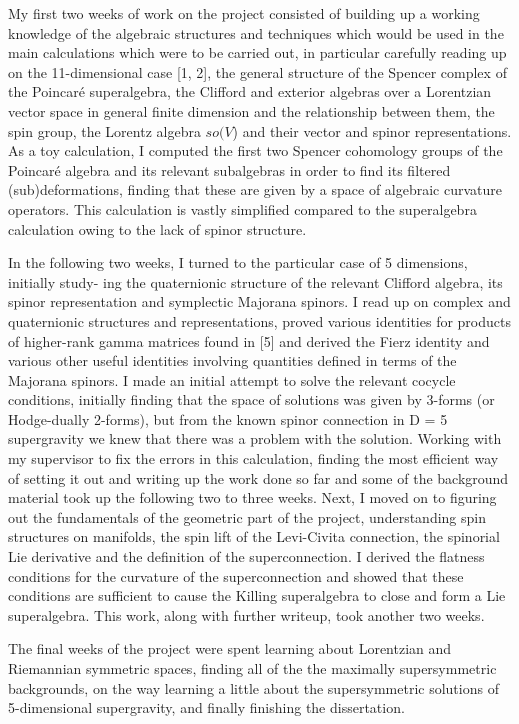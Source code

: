 \documentclass[12pt,a4paper]{report}
\begin{document}
My first two weeks of work on the project consisted of building up a
working knowledge of the algebraic structures and techniques which
would be used in the main calculations which were to be carried out,
in particular carefully reading up on the 11-dimensional case [1, 2],
the general structure of the Spencer complex of the Poincar\'e
superalgebra, the Clifford and exterior algebras over a Lorentzian
vector space in general finite dimension and the relationship between
them, the spin group, the Lorentz algebra $so(V$) and their vector and
spinor representations. As a toy calculation, I computed the first two
Spencer cohomology groups of the Poincar\'e algebra and its relevant
subalgebras in order to find its filtered (sub)deformations, finding
that these are given by a space of algebraic curvature operators. This
calculation is vastly simplified compared to the superalgebra
calculation owing to the lack of spinor structure.

In the following two weeks, I turned to the particular case of 5
dimensions, initially study- ing the quaternionic structure of the
relevant Clifford algebra, its spinor representation and symplectic
Majorana spinors. I read up on complex and quaternionic structures and
representations, proved various identities for products of higher-rank
gamma matrices found in [5] and derived the Fierz identity and various
other useful identities involving quantities defined in terms of the
Majorana spinors. I made an initial attempt to solve the relevant
cocycle conditions, initially finding that the space of solutions was
given by 3-forms (or Hodge-dually 2-forms), but from the known spinor
connection in D = 5 supergravity we knew that there was a problem with
the solution. Working with my supervisor to fix the errors in this
calculation, finding the most efficient way of setting it out and
writing up the work done so far and some of the background material
took up the following two to three weeks.  Next, I moved on to
figuring out the fundamentals of the geometric part of the project,
understanding spin structures on manifolds, the spin lift of the
Levi-Civita connection, the spinorial Lie derivative and the
definition of the superconnection. I derived the flatness conditions
for the curvature of the superconnection and showed that these
conditions are sufficient to cause the Killing superalgebra to close
and form a Lie superalgebra. This work, along with further writeup,
took another two weeks.

The final weeks of the project were spent learning about Lorentzian
and Riemannian symmetric spaces, finding all of the the maximally
supersymmetric backgrounds, on the way learning a little about the
supersymmetric solutions of 5-dimensional supergravity, and finally
finishing the dissertation.
\end{document}
